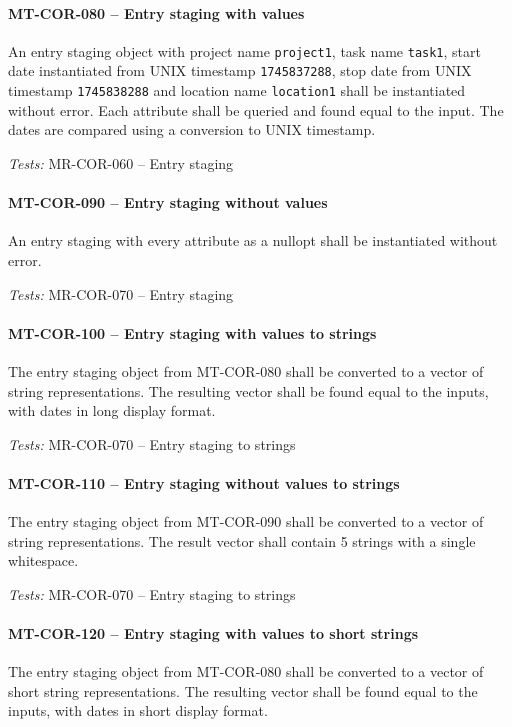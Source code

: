 \paragraph{MT-COR-080 -- Entry staging with values}
An entry staging object with project name \lstinline{project1},
task name \lstinline{task1}, start date instantiated from UNIX timestamp
\lstinline{1745837288}, stop date from UNIX timestamp
\lstinline{1745838288} and location name \lstinline{location1}
shall be instantiated without error.
Each attribute shall be queried and found equal to the input.
The dates are compared using a conversion to UNIX timestamp.

\textit{Tests: } MR-COR-060 -- Entry staging

\paragraph{MT-COR-090 -- Entry staging without values}
An entry staging with every attribute as a nullopt shall be instantiated
without error.

\textit{Tests: } MR-COR-070 -- Entry staging

\paragraph{MT-COR-100 -- Entry staging with values to strings}
The entry staging object from MT-COR-080 shall be converted to
a vector of string representations. The resulting vector shall be
found equal to the inputs, with dates in long display format.

\textit{Tests: } MR-COR-070 -- Entry staging to strings

\paragraph{MT-COR-110 -- Entry staging without values to strings}
The entry staging object from MT-COR-090 shall be converted to
a vector of string representations. The result vector shall
contain 5 strings with a single whitespace.

\textit{Tests: } MR-COR-070 -- Entry staging to strings

\paragraph{MT-COR-120 -- Entry staging with values to short strings}
The entry staging object from MT-COR-080 shall be converted to
a vector of short string representations. The resulting vector shall be
found equal to the inputs, with dates in short display format.

